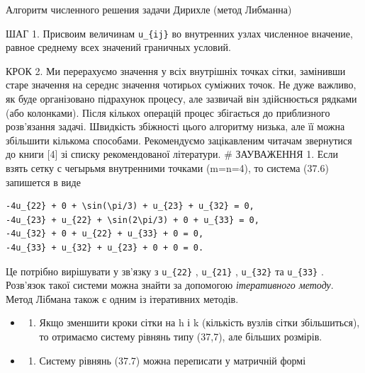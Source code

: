 \documentclass[
  ukrainian,
]{article}
\providecommand{\tightlist}{%
  \setlength{\itemsep}{0pt}\setlength{\parskip}{0pt}}
\begin{document}
Алгоритм численного решения задачи Дирихле (метод Либманна)

ШАГ 1. Присвоим величинам \texttt{u\_\{ij\}} во внутренних узлах
численное вначение, равное среднему всех значений граничных условий.

КРОК 2. Ми перерахуємо значення у всіх внутрішніх точках сітки,
замінивши старе значення на середнє значення чотирьох суміжних точок. Не
дуже важливо, як буде організовано підрахунок процесу, але зазвичай він
здійснюється рядками (або колонками). Після кількох операцій процес
збігається до приблизного розв'язання задачі. Швидкість збіжності цього
алгоритму низька, але її можна збільшити кількома способами.
Рекомендуємо зацікавленим читачам звернутися до книги {[}4{]} зі списку
рекомендованої літератури. \# ЗАУВАЖЕННЯ 1. Если взять сетку с чегырьмя
внутренними точками (m=n=4), то система (37.6) запишется в виде

\begin{verbatim}
-4u_{22} + 0 + \sin(\pi/3) + u_{23} + u_{32} = 0,
-4u_{23} + u_{22} + \sin(2\pi/3) + 0 + u_{33} = 0,
-4u_{32} + 0 + u_{22} + u_{33} + 0 = 0,
-4u_{33} + u_{32} + u_{23} + 0 + 0 = 0.
\end{verbatim}

Це потрібно вирішувати у зв'язку з \texttt{u\_\{22\}} ,
\texttt{u\_\{21\}} , \texttt{u\_\{32\}} та \texttt{u\_\{33\}} .
Розв'язок такої системи можна знайти за допомогою \emph{ітеративного
методу}. Метод Лібмана також є одним із ітеративних методів.

\begin{itemize}
\tightlist
\item
  \begin{enumerate}
  \def\labelenumi{\arabic{enumi}.}
  \setcounter{enumi}{1}
  \tightlist
  \item
    Якщо зменшити кроки сітки на h і k (кількість вузлів сітки
    збільшиться), то отримаємо систему рівнянь типу (37,7), але більших
    розмірів.
  \end{enumerate}
\item
  \begin{enumerate}
  \def\labelenumi{\arabic{enumi}.}
  \setcounter{enumi}{2}
  \tightlist
  \item
    Систему рівнянь (37.7) можна переписати у матричній формі
  \end{enumerate}
\end{itemize}
\end{document}

